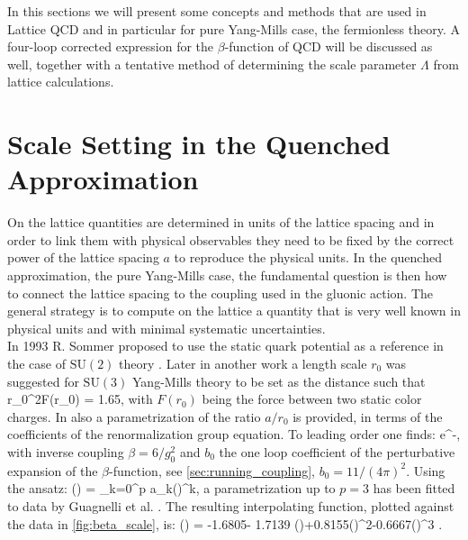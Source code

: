 In this sections we will present some concepts and methods that are used in Lattice QCD and in particular for pure Yang-Mills case, the fermionless theory. A four-loop corrected expression for the $\beta$-function of QCD will be discussed as well, together with a tentative method of determining the scale parameter $\Lambda$ from lattice calculations.

\section{Scale Setting in the Quenched Approximation}
On the lattice quantities are determined in units of the lattice spacing and in order to link them with physical observables they need to be fixed by the correct power of the lattice spacing $a$ to reproduce the physical units. In the quenched approximation, the pure Yang-Mills case, the fundamental question is then how to connect the lattice spacing to the coupling used in the gluonic action. The general strategy is to compute on the lattice a quantity that is very well known in physical units and with minimal systematic uncertainties.\\ 
In 1993 R. Sommer proposed to use the static quark potential as a reference in the case of $\mathrm{SU}(2)$ theory \cite{sommer_new_1994}. Later in another work \cite{guagnelli_precision_1998} a length scale $r_0$ was suggested for $\mathrm{SU}(3)$ Yang-Mills theory to be set as the distance such that 
\beq
r_0^2F(r_0) = 1.65,
\eeq 
with $F(r_0)$ being the force between two static color charges. In \cite{guagnelli_precision_1998} also a parametrization of the ratio $a/r_0$ is provided, in terms of the coefficients of the renormalization group equation. To leading order one finds:
\beq
     \propto e^{-},
\eeq
with inverse coupling $\beta = 6/g_0^2$ and $b_0$ the one loop coefficient of the perturbative expansion of the $\beta$-function, see \cref{sec:running_coupling}, $b_0=11/(4\pi)^2$. Using the ansatz:
\beq
    \ln\left(\right) = \sum_{k=0}^p a_k()^k,
\eeq
a parametrization up to $p=3$ has been fitted to data by Guagnelli et al. \cite{guagnelli_precision_1998}. The resulting interpolating function, plotted against the data in \cref{fig:beta_scale}, is:
\beq
    \ln\left(\right) = -1.6805- 1.7139 ()+0.8155()^2-0.6667()^3
    \label{scale:parameter}.
\eeq

 

